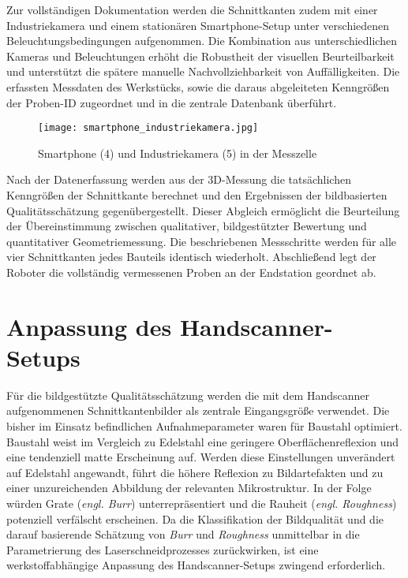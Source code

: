 Zur vollständigen Dokumentation werden die Schnittkanten zudem mit einer Industriekamera und einem stationären Smartphone-Setup unter verschiedenen Beleuchtungsbedingungen aufgenommen. Die Kombination aus unterschiedlichen Kameras und Beleuchtungen erhöht die Robustheit der visuellen Beurteilbarkeit und unterstützt die spätere manuelle Nachvollziehbarkeit von Auffälligkeiten. Die erfassten Messdaten des Werkstücks, sowie die daraus abgeleiteten Kenngrößen der Proben-ID zugeordnet und in die zentrale Datenbank überführt.

\begin{figure}[htbp]
    \centering
    \texttt{[image: smartphone\_industriekamera.jpg]}
    \caption{Smartphone (4) und Industriekamera (5) in der Messzelle}
    \label{fig:smartphone_industriekamera}
\end{figure}

Nach der Datenerfassung werden aus der 3D-Messung die tatsächlichen Kenngrößen der Schnittkante berechnet und den Ergebnissen der bildbasierten Qualitätsschätzung gegenübergestellt. Dieser Abgleich ermöglicht die Beurteilung der Übereinstimmung zwischen qualitativer, bildgestützter Bewertung und quantitativer Geometriemessung. Die beschriebenen Messschritte werden für alle vier Schnittkanten jedes Bauteils identisch wiederholt. Abschließend legt der Roboter die vollständig vermessenen Proben an der Endstation geordnet ab.

\newpage

\section{Anpassung des Handscanner-Setups}

Für die bildgestützte Qualitätsschätzung werden die mit dem Handscanner aufgenommenen Schnittkantenbilder als zentrale Eingangsgröße verwendet. Die bisher im Einsatz befindlichen Aufnahmeparameter waren für Baustahl optimiert. Baustahl weist im Vergleich zu Edelstahl eine geringere Oberflächenreflexion und eine tendenziell matte Erscheinung auf. Werden diese Einstellungen unverändert auf Edelstahl angewandt, führt die höhere Reflexion zu Bildartefakten und zu einer unzureichenden Abbildung der relevanten Mikrostruktur. In der Folge würden Grate (\emph{engl. Burr}) unterrepräsentiert und die Rauheit (\emph{engl. Roughness}) potenziell verfälscht erscheinen. Da die Klassifikation der Bildqualität und die darauf basierende Schätzung von \emph{Burr} und \emph{Roughness} unmittelbar in die Parametrierung des Laserschneidprozesses zurückwirken, ist eine werkstoffabhängige Anpassung des Handscanner-Setups zwingend erforderlich.

